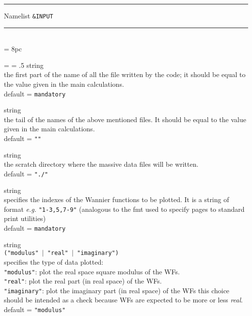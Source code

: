 \begin{centering}
\rule{2.2in}{0.01in} Namelist {\tt \&INPUT} \rule{2.2in}{0.01in}
\end{centering}\\

\newdimen\descindent \descindent = 8pc
{\noindent \leftskip = \descindent \parskip = .5\baselineskip
{}%
{\sc string} \\ the first part of the name of all the file written by the code;
              it should be equal to the value given in the main calculations.\\
              {\sc default} = {\tt mandatory} \par

\noindent{}%
{\sc string} \\ the tail of the names of the above mentioned files.
              It should be equal to the value given in the main calculations.\\
              {\sc default} = {\tt ""} \par

\noindent{}%
{\sc string} \\ the scratch directory where the massive data files will be written.\\
              {\sc default} = {\tt "./"} \par

\noindent{}%
{\sc string} \\ specifies the indexes of the Wannier functions to be plotted.
              It is a string of format {\it e.g.} {\tt "1-3,5,7-9"}
              (analogous to the fmt used to specify pages to standard print utilities)\\
              {\sc default} = {\tt mandatory} \par

\noindent{}%
{\sc string} \\ {\tt ("modulus" $\mid$ "real" $\mid$ "imaginary") }\\
              specifies the type of data plotted:\\
                {\tt "modulus"}:    plot the real space square modulus of the WFs. \\
                {\tt "real"}:       plot the real part (in real space) of the WFs. \\
                {\tt "imaginary"}:  plot the imaginary part (in real space) of the WFs
                              this choice should be intended as a check because WFs
                              are expected to be more or less {\it real}.\\
              {\sc default} = {\tt "modulus"} \par

}
